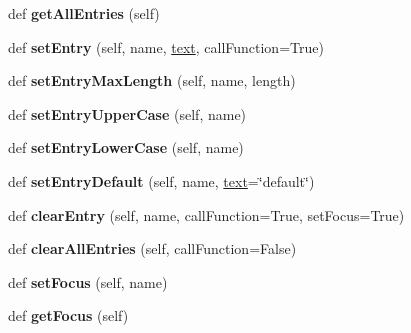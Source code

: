 \begin{DoxyCompactItemize}
def {\bfseries get\+All\+Entries} (self)
\item 
\mbox{\label{classappjar_1_1gui_a5d05b60fda973f283399244a27fc98f1}} 
def {\bfseries set\+Entry} (self, name, \hyperlink{classappjar_1_1gui_a221b516425bf76dd8560ec9f4818182f}{text}, call\+Function=True)
\item 
\mbox{\label{classappjar_1_1gui_a667642833fb0f73cb1ea4fdd3d175683}} 
def {\bfseries set\+Entry\+Max\+Length} (self, name, length)
\item 
\mbox{\label{classappjar_1_1gui_a300c42338402cc90d34c518ab9fa1845}} 
def {\bfseries set\+Entry\+Upper\+Case} (self, name)
\item 
\mbox{\label{classappjar_1_1gui_abebc43d660979349aee276e3e4d0dc2b}} 
def {\bfseries set\+Entry\+Lower\+Case} (self, name)
\item 
\mbox{\label{classappjar_1_1gui_a16a194b354aee73b946fee9dad327c58}} 
def {\bfseries set\+Entry\+Default} (self, name, \hyperlink{classappjar_1_1gui_a221b516425bf76dd8560ec9f4818182f}{text}=\char`\"{}default\char`\"{})
\item 
\mbox{\label{classappjar_1_1gui_a6dac457d56c5f3ab71475f7120dd85cd}} 
def {\bfseries clear\+Entry} (self, name, call\+Function=True, set\+Focus=True)
\item 
\mbox{\label{classappjar_1_1gui_abf61b894d6784adc54b56cd79a56f4c2}} 
def {\bfseries clear\+All\+Entries} (self, call\+Function=False)
\item 
\mbox{\label{classappjar_1_1gui_a8b6392043cfb426369892f10e7eac9ba}} 
def {\bfseries set\+Focus} (self, name)
\item 
\mbox{\label{classappjar_1_1gui_ae0db06cfcee3a1c4bd4e39cf03440339}} 
def {\bfseries get\+Focus} (self)
\end{DoxyCompactItemize}
